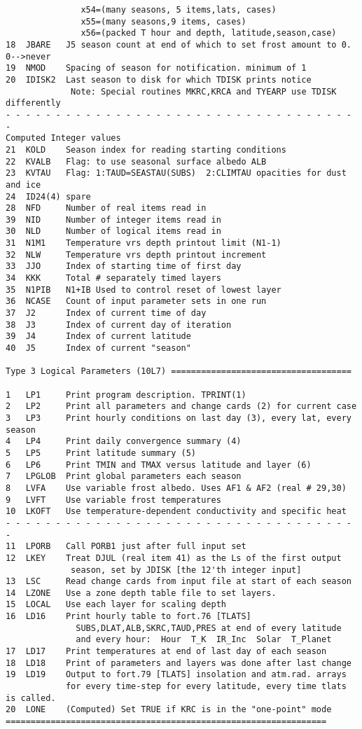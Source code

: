 \documentclass{article}
\begin{document}
\begin{verbatim}
               x54=(many seasons, 5 items,lats, cases)
               x55=(many seasons,9 items, cases)
               x56=(packed T hour and depth, latitude,season,case)
18  JBARE   J5 season count at end of which to set frost amount to 0. 0-->never
19  NMOD    Spacing of season for notification. minimum of 1
20  IDISK2  Last season to disk for which TDISK prints notice
             Note: Special routines MKRC,KRCA and TYEARP use TDISK differently
- - - - - - - - - - - - - - - - - - - - - - - - - - - - - - - - - - - - 
Computed Integer values
21  KOLD    Season index for reading starting conditions
22  KVALB   Flag: to use seasonal surface albedo ALB
23  KVTAU   Flag: 1:TAUD=SEASTAU(SUBS)  2:CLIMTAU opacities for dust and ice
24  ID24(4) spare
28  NFD     Number of real items read in
39  NID     Number of integer items read in
30  NLD     Number of logical items read in
31  N1M1    Temperature vrs depth printout limit (N1-1)
32  NLW     Temperature vrs depth printout increment
33  JJO     Index of starting time of first day
34  KKK     Total # separately timed layers
35  N1PIB   N1+IB Used to control reset of lowest layer
36  NCASE   Count of input parameter sets in one run
37  J2      Index of current time of day
38  J3      Index of current day of iteration
39  J4      Index of current latitude
40  J5      Index of current "season"

Type 3 Logical Parameters (10L7) ====================================

1   LP1     Print program description. TPRINT(1) 
2   LP2     Print all parameters and change cards (2) for current case
3   LP3     Print hourly conditions on last day (3), every lat, every season
4   LP4     Print daily convergence summary (4)
5   LP5     Print latitude summary (5)
6   LP6     Print TMIN and TMAX versus latitude and layer (6)
7   LPGLOB  Print global parameters each season
8   LVFA    Use variable frost albedo. Uses AF1 & AF2 (real # 29,30)
9   LVFT    Use variable frost temperatures
10  LKOFT   Use temperature-dependent conductivity and specific heat
- - - - - - - - - - - - - - - - - - - - - - - - - - - - - - - - - - - - 
11  LPORB   Call PORB1 just after full input set
12  LKEY    Treat DJUL (real item 41) as the Ls of the first output
             season, set by JDISK [the 12'th integer input]
13  LSC     Read change cards from input file at start of each season
14  LZONE   Use a zone depth table file to set layers.
15  LOCAL   Use each layer for scaling depth
16  LD16    Print hourly table to fort.76 [TLATS] 
              SUBS,DLAT,ALB,SKRC,TAUD,PRES at end of every latitude
              and every hour:  Hour  T_K  IR_Inc  Solar  T_Planet
17  LD17    Print temperatures at end of last day of each season
18  LD18    Print of parameters and layers was done after last change
19  LD19    Output to fort.79 [TLATS] insolation and atm.rad. arrays 
            for every time-step for every latitude, every time tlats is called.
20  LONE    (Computed) Set TRUE if KRC is in the "one-point" mode
================================================================


\end{verbatim}
\end{document}
